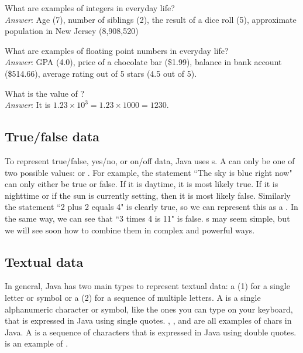 \begin{example}
What are examples of integers in everyday life? \\

\noindent \emph{Answer}: Age (7), number of siblings (2), the result of a dice roll (5), approximate population in New Jersey (8,908,520)
\end{example}

\begin{example}
What are examples of floating point numbers in everyday life? \\

\noindent \emph{Answer}: GPA (4.0), price of a chocolate bar (\$1.99), balance in bank account (\$514.66), average rating out of 5 stars (4.5 out of 5).
\end{example}

\begin{example}
What is the value of ? \\

\noindent \emph{Answer}: It is $1.23 \times 10^3 = 1.23 \times 1000 = 1230$.
\end{example} 

\subsection{True/false data}
To represent true/false, yes/no, or on/off data, Java uses s. A  can only be one of two possible values:  or . For example, the statement ``The sky is blue right now" can only either be true or false. If it is daytime, it is most likely true. If it is nighttime or if the sun is currently setting, then it is most likely false. Similarly the statement ``2 plus 2 equals 4" is clearly true, so we can represent this as a . In the same way, we can see that ``3 times 4 is 11" is false. s may seem simple, but we will see soon how to combine them in complex and powerful ways.

\subsection{Textual data}
In general, Java has two main types to represent textual data: a (1)  for a single letter or symbol or a (2)  for a sequence of multiple letters. A  is a single alphanumeric character or symbol, like the ones you can type on your keyboard, that is expressed in Java using single quotes. , , and  are all examples of chars in Java. A  is a sequence of characters that is expressed in Java using double quotes.  is an example of . 

